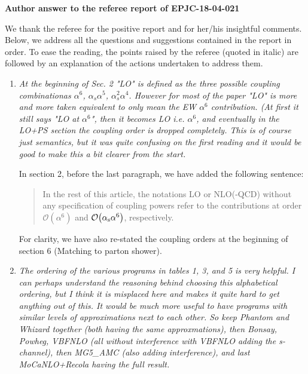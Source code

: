 \documentclass{report}
\begin{document}
\noindent

\begin{center}
  \LARGE \textbf{Author answer to the referee report of EPJC-18-04-021}
\end{center}
\vspace{0.5cm}
We thank the referee for the positive report and for her/his insightful comments. Below, we address all the questions and suggestions contained in the report in order. To ease the reading, the points raised by the referee (quoted in italic) are followed by an  explanation of the actions undertaken to address them. 

\vspace{0.5cm}
\begin{enumerate}

    \item \emph{At the beginning of Sec. 2 "LO" is defined as the three possible coupling
combinationas $\alpha^6$, $\alpha_s \alpha^5$, $\alpha_s^2 \alpha^4$. However for most of the paper "LO" is more 
and more taken equivalent to only mean the EW $\alpha^6$ contribution. (At first it still says "LO at $\alpha^6$", 
then it becomes
LO i.e. $\alpha^6$, and eventually in the LO+PS section the coupling order is dropped completely. 
This is of course just semantics, but it was quite confusing on the first reading and it would be good to make this a bit clearer from the start.}

In section 2, before the last paragraph, we have added the following sentence:
\begin{quote}
In the rest of this article, the notations LO or NLO(-QCD) without any specification of coupling powers refer to the contributions at order $\mathcal{O}{\left(\alpha^{6}\right)}$ and $\mathcal{O}{\left(\alpha_{\rm s}\alpha^{6}\right)}$, respectively.  
\end{quote}
For clarity, we have also re-stated the coupling orders at the beginning of section 6 (Matching to parton shower).

    \item \emph{The ordering of the various programs in tables 1, 3, and 5 is very helpful.
I can perhaps understand the reasoning behind choosing this alphabetical
ordering, but I think it is misplaced here and makes it quite hard to get
anything out of this. It would be much more useful to have programs with similar levels of approximations next to each other. So keep Phantom and Whizard together (both having the same approxmations), then Bonsay, Powheg, VBFNLO (all without interference with VBFNLO adding the s-channel), then MG5\_AMC (also adding interference), and last MoCaNLO+Recola having the full result.}


\end{enumerate}
\end{document}
